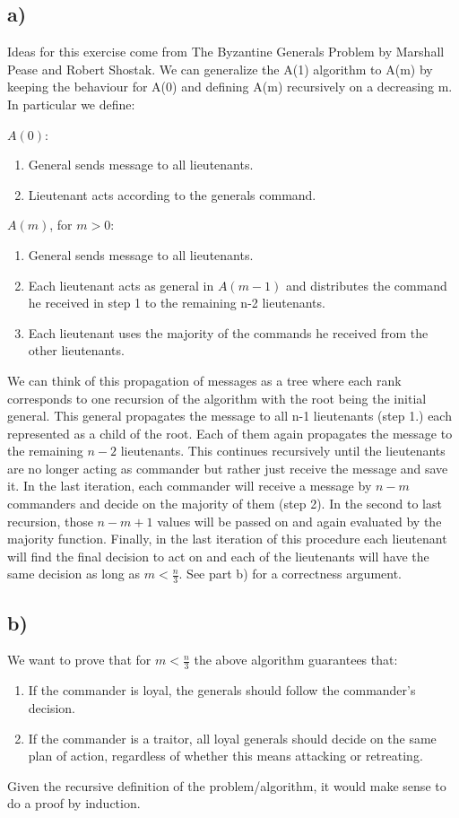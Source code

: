 \documentclass[12pt]{article}
\begin{document}
\subsection*{a)}
Ideas for this exercise come from The Byzantine Generals Problem by Marshall Pease and Robert Shostak.
We can generalize the A(1) algorithm to A(m) by keeping the behaviour for A(0) and defining A(m) recursively on a decreasing m. In particular we define:

$A(0)$:
\begin{enumerate}
\item General sends message to all lieutenants.
\item Lieutenant acts according to the generals command.
\end{enumerate}

$A(m)$, for $m>0$:
\begin{enumerate}
\item General sends message to all lieutenants.
\item Each lieutenant acts as general in $A(m-1)$ and distributes the command he received in step 1 to the remaining n-2 lieutenants.
\item Each lieutenant uses the majority of the commands he received from the other lieutenants.
\end{enumerate}
We can think of this propagation of messages as a tree where each rank corresponds to one recursion of the algorithm with the root being the initial general. This general propagates the message to all n-1 lieutenants (step 1.) each represented as a child of the root. Each of them again propagates the message to the remaining $n-2$ lieutenants. This continues recursively until the lieutenants are no longer acting as commander but rather just receive the message and save it. In the last iteration, each commander will receive a message by $n-m$ commanders and decide on the majority of them (step 2). In the second to last recursion, those $n-m+1$ values will be passed on and again evaluated by the majority function. Finally, in the last iteration of this procedure each lieutenant will find the final decision to act on and each of the lieutenants will have the same decision as long as $m < \frac{n}{3}$. See part b) for a correctness argument.

\subsection*{b)}
We want to prove that for $m < \frac{n}{3}$ the above algorithm guarantees that:
\begin{enumerate}
\item If the commander is loyal, the generals should follow the commander's decision.
\item If the commander is a traitor, all loyal generals should decide on the same plan of action, regardless of whether this means attacking or retreating.
\end{enumerate}
Given the recursive definition of the problem/algorithm, it would make sense to do a proof by induction.\\
\end{document}
